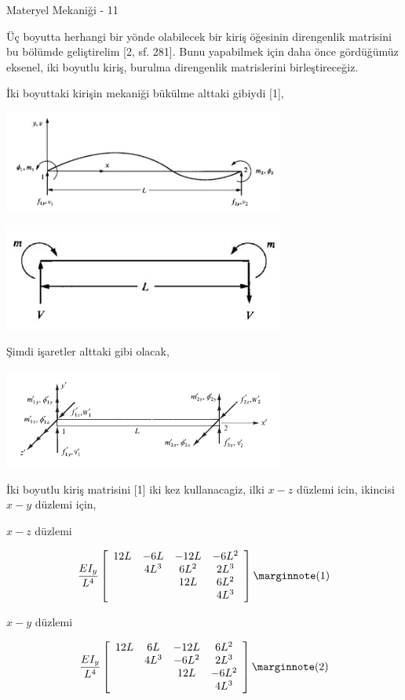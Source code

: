 \documentclass[12pt,fleqn]{article}\usepackage{../../common}
\begin{document}
Materyel Mekaniği - 11

Üç boyutta herhangi bir yönde olabilecek bir kiriş öğesinin direngenlik
matrisini bu bölümde geliştirelim [2, sf. 281]. Bunu yapabilmek için daha önce
gördüğümüz eksenel, iki boyutlu kiriş, burulma direngenlik matrislerini
birleştireceğiz.

İki boyuttaki kirişin mekaniği bükülme alttaki gibiydi [1],

\includegraphics[width=25em]{phy_020_strs_11_02.jpg}

\includegraphics[width=25em]{phy_020_strs_11_03.jpg}

Şimdi işaretler alttaki gibi olacak,

\includegraphics[width=25em]{phy_020_strs_11_01.jpg}

İki boyutlu kiriş matrisini [1] iki kez kullanacagiz, ilki $x-z$ düzlemi icin,
ikincisi $x-y$ düzlemi için,

$x-z$ düzlemi

$$
\frac{EI_y}{L^4}
\left[\begin{array}{cccc}
12L & -6L  & -12L & -6L^2 \\
    & 4L^3 & 6L^2 & 2L^3  \\
    &      & 12L  & 6L^2  \\
    &      &      & 4L^3
\end{array}\right]
\mlabel{1}
$$

$x-y$ düzlemi

$$
\frac{EI_y}{L^4}
\left[\begin{array}{cccc}
12L & 6L  & -12L & 6L^2 \\
    & 4L^3 & -6L^2 & 2L^3  \\
    &      & 12L  & -6L^2  \\
    &      &      & 4L^3
\end{array}\right]
\mlabel{2}
$$
\end{document}
